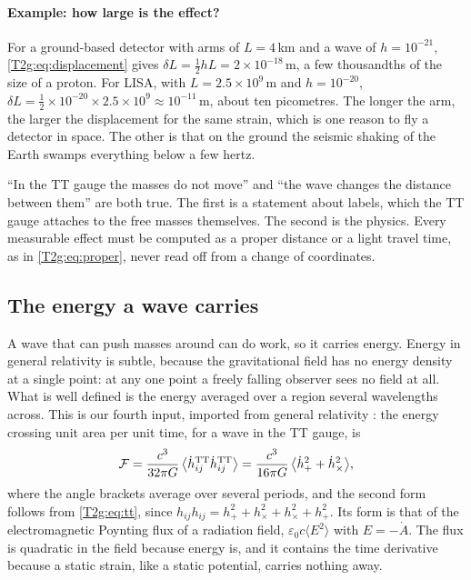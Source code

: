 \paragraph{Example: how large is the effect?}
For a ground-based detector with arms of $L=4$\,km and a wave of $h=10^{-21}$, \eqref{T2g:eq:displacement} gives $\delta L=\tfrac12hL=2\times10^{-18}$\,m, a few thousandths of the size of a proton. For LISA, with $L=2.5\times10^9$\,m and $h=10^{-20}$, $\delta L=\tfrac12\times10^{-20}\times2.5\times10^9\approx10^{-11}$\,m, about ten picometres. The longer the arm, the larger the displacement for the same strain, which is one reason to fly a detector in space. The other is that on the ground the seismic shaking of the Earth swamps everything below a few hertz.

\begin{pitfall}
``In the TT gauge the masses do not move'' and ``the wave changes the distance between them'' are both true. The first is a statement about labels, which the TT gauge attaches to the free masses themselves. The second is the physics. Every measurable effect must be computed as a proper distance or a light travel time, as in \eqref{T2g:eq:proper}, never read off from a change of coordinates.
\end{pitfall}

\subsection{The energy a wave carries}
\label{T2g:sec:energy}

A wave that can push masses around can do work, so it carries energy. Energy in general relativity is subtle, because the gravitational field has no energy density at a single point: at any one point a freely falling observer sees no field at all. What is well defined is the energy averaged over a region several wavelengths across. This is our fourth input, imported from general relativity \cite[Sec.~1.4]{Maggiore2007}: the energy crossing unit area per unit time, for a wave in the TT gauge, is
\begin{equation}
  \mathcal F=\frac{c^3}{32\pi G}\,\big\langle\dot h^{\rm TT}_{ij}\dot h^{\rm TT}_{ij}\big\rangle
  =\frac{c^3}{16\pi G}\,\big\langle\dot h_+^2+\dot h_\times^2\big\rangle ,
  \label{T2g:eq:flux}
\end{equation}
where the angle brackets average over several periods, and the second form follows from \eqref{T2g:eq:tt}, since $h_{ij}h_{ij}=h_+^2+h_\times^2+h_\times^2+h_+^2$. Its form is that of the electromagnetic Poynting flux of a radiation field, $\varepsilon_0c\langle E^2\rangle$ with $E=-\dot A$. The flux is quadratic in the field because energy is, and it contains the time derivative because a static strain, like a static potential, carries nothing away.

